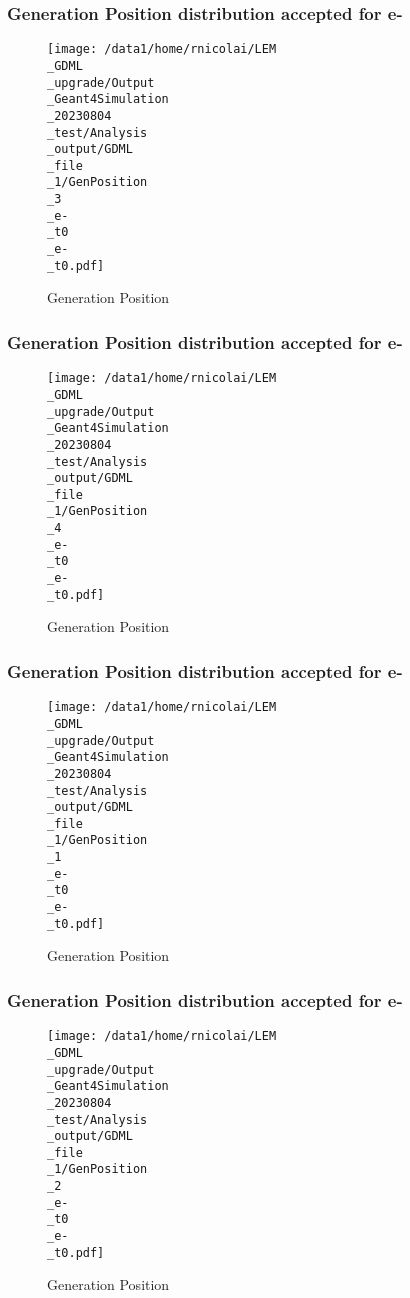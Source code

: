 \documentclass[8pt]{beamer}
\begin{document}
            \begin{frame}
                \frametitle{Generation Position distribution accepted for e-}
            
        \begin{figure}[h]
            \centering
            \texttt{[image: /data1/home/rnicolai/LEM\\\_GDML\\\_upgrade/Output\\\_Geant4Simulation\\\_20230804\\\_test/Analysis\\\_output/GDML\\\_file\\\_1/GenPosition\\\_3\\\_e-\\\_t0\\\_e-\\\_t0.pdf]}
            \caption{Generation Position}
        \end{figure}
        
            \end{frame}
            
            \begin{frame}
                \frametitle{Generation Position distribution accepted for e-}
            
        \begin{figure}[h]
            \centering
            \texttt{[image: /data1/home/rnicolai/LEM\\\_GDML\\\_upgrade/Output\\\_Geant4Simulation\\\_20230804\\\_test/Analysis\\\_output/GDML\\\_file\\\_1/GenPosition\\\_4\\\_e-\\\_t0\\\_e-\\\_t0.pdf]}
            \caption{Generation Position}
        \end{figure}
        
            \end{frame}
            
            \begin{frame}
                \frametitle{Generation Position distribution accepted for e-}
            
        \begin{figure}[h]
            \centering
            \texttt{[image: /data1/home/rnicolai/LEM\\\_GDML\\\_upgrade/Output\\\_Geant4Simulation\\\_20230804\\\_test/Analysis\\\_output/GDML\\\_file\\\_1/GenPosition\\\_1\\\_e-\\\_t0\\\_e-\\\_t0.pdf]}
            \caption{Generation Position}
        \end{figure}
        
            \end{frame}
            
            \begin{frame}
                \frametitle{Generation Position distribution accepted for e-}
            
        \begin{figure}[h]
            \centering
            \texttt{[image: /data1/home/rnicolai/LEM\\\_GDML\\\_upgrade/Output\\\_Geant4Simulation\\\_20230804\\\_test/Analysis\\\_output/GDML\\\_file\\\_1/GenPosition\\\_2\\\_e-\\\_t0\\\_e-\\\_t0.pdf]}
            \caption{Generation Position}
        \end{figure}
        
            \end{frame}
            
\end{document}
